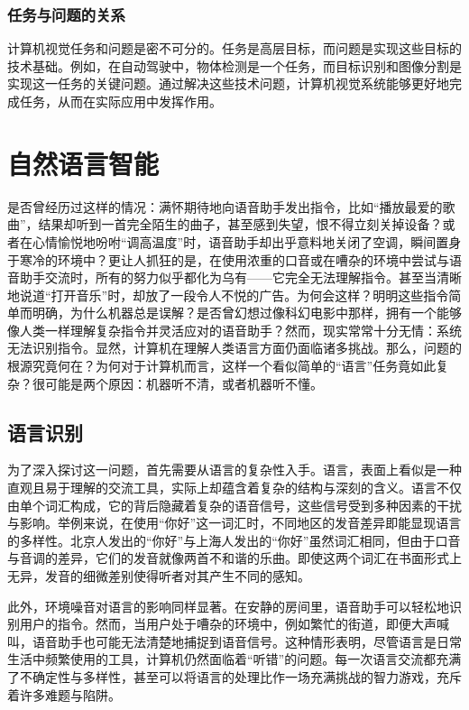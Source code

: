 \subsubsection{任务与问题的关系}

计算机视觉任务和问题是密不可分的。任务是高层目标，而问题是实现这些目标的技术基础。例如，在自动驾驶中，物体检测是一个任务，而目标识别和图像分割是实现这一任务的关键问题。通过解决这些技术问题，计算机视觉系统能够更好地完成任务，从而在实际应用中发挥作用。

\section{自然语言智能}

是否曾经历过这样的情况：满怀期待地向语音助手发出指令，比如“播放最爱的歌曲”，结果却听到一首完全陌生的曲子，甚至感到失望，恨不得立刻关掉设备？或者在心情愉悦地吩咐“调高温度”时，语音助手却出乎意料地关闭了空调，瞬间置身于寒冷的环境中？更让人抓狂的是，在使用浓重的口音或在嘈杂的环境中尝试与语音助手交流时，所有的努力似乎都化为乌有——它完全无法理解指令。甚至当清晰地说道“打开音乐”时，却放了一段令人不悦的广告。为何会这样？明明这些指令简单而明确，为什么机器总是误解？是否曾幻想过像科幻电影中那样，拥有一个能够像人类一样理解复杂指令并灵活应对的语音助手？然而，现实常常十分无情：系统无法识别指令。显然，计算机在理解人类语言方面仍面临诸多挑战。那么，问题的根源究竟何在？为何对于计算机而言，这样一个看似简单的“语言”任务竟如此复杂？很可能是两个原因：机器听不清，或者机器听不懂。

\subsection{语言识别}

为了深入探讨这一问题，首先需要从语言的复杂性入手。语言，表面上看似是一种直观且易于理解的交流工具，实际上却蕴含着复杂的结构与深刻的含义。语言不仅由单个词汇构成，它的背后隐藏着复杂的语音信号，这些信号受到多种因素的干扰与影响。举例来说，在使用“你好”这一词汇时，不同地区的发音差异即能显现语言的多样性。北京人发出的“你好”与上海人发出的“你好”虽然词汇相同，但由于口音与音调的差异，它们的发音就像两首不和谐的乐曲。即使这两个词汇在书面形式上无异，发音的细微差别使得听者对其产生不同的感知。

此外，环境噪音对语言的影响同样显著。在安静的房间里，语音助手可以轻松地识别用户的指令。然而，当用户处于嘈杂的环境中，例如繁忙的街道，即便大声喊叫，语音助手也可能无法清楚地捕捉到语音信号。这种情形表明，尽管语言是日常生活中频繁使用的工具，计算机仍然面临着“听错”的问题。每一次语言交流都充满了不确定性与多样性，甚至可以将语言的处理比作一场充满挑战的智力游戏，充斥着许多难题与陷阱。

